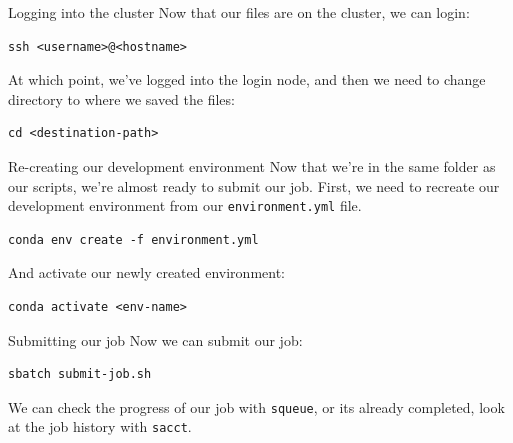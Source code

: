 \documentclass[10pt]{beamer}
\begin{document}
\begin{frame}[label={sec:orge2652ed},fragile]{Logging into the cluster}
 Now that our files are on the cluster, we can login:

\begin{verbatim}
ssh <username>@<hostname>
\end{verbatim}

At which point, we've logged into the login node, and then we need to change
directory to where we saved the files:

\begin{verbatim}
cd <destination-path>
\end{verbatim}
\end{frame}

\begin{frame}[label={sec:orgef8a3bc},fragile]{Re-creating our development environment}
 Now that we're in the same folder as our scripts, we're almost ready to submit
our job. First, we need to recreate our development environment from our
\texttt{environment.yml} file.

\begin{verbatim}
conda env create -f environment.yml
\end{verbatim}

And activate our newly created environment:

\begin{verbatim}
conda activate <env-name>
\end{verbatim}
\end{frame}

\begin{frame}[label={sec:org409099f},fragile]{Submitting our job}
 Now we can submit our job:

\begin{verbatim}
sbatch submit-job.sh
\end{verbatim}

We can check the progress of our job with \texttt{squeue}, or its already completed, look
at the job history with \texttt{sacct}.
\end{frame}
\end{document}
